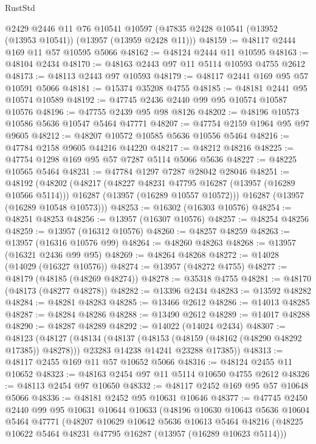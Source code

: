 \begin{lexlean}{RustStd}
\begin{coremodule}
    @2429
    @2446
    @11
    @76
    @10541
    @10597
    (@47835 @2428 @10541 (@13952 (@13953 @10541)) (@13957 (@13959 @2428 @11)))
@48159 := @48117 @2444 @169 @11 @57 @10595 @5066
@48162 := @48124 @2444 @11 @10595
@48163 := @48104 @2434
@48170 := @48163 @2443 @97 @11 @5114 @10593 @4755 @2612
@48173 := @48113 @2443 @97 @10593
@48179 := @48117 @2441 @169 @95 @57 @10591 @5066
@48181 := @15374 @35208 @4755
@48185 := @48181 @2441 @95 @10574 @10589
@48192 := @47745 @2436 @2440 @99 @95 @10574 @10587 @10576
@48196 := @47755 @2439 @95 @98 @8126
@48202 := @48196 @10573 @10586 @5636 @10547 @5464 @47771
@48207 := @47754 @2159 @1964 @95 @97 @9605
@48212 := @48207 @10572 @10585 @5636 @10556 @5464
@48216 := @47784 @2158 @9605 @44216 @44220
@48217 := @48212 @48216
@48225 := @47754 @1298 @169 @95 @57 @7287 @5114 @5066 @5636
@48227 := @48225 @10565 @5464
@48231 := @47784 @1297 @7287 @28042 @28046
@48251 := @48192
    (@48202
      (@48217
        (@48227 @48231 @47795 @16287 (@13957 (@16289 @10566 @5114)))
        @16287
        (@13957 (@16289 @10557 @10572)))
      @16287
      (@13957 (@16289 @10548 @10573)))
@48253 := @16302 (@16303 @10576)
@48254 := @48251 @48253
@48256 := @13957 (@16307 @10576)
@48257 := @48254 @48256
@48259 := @13957 (@16312 @10576)
@48260 := @48257 @48259
@48263 := @13957 (@16316 @10576 @99)
@48264 := @48260 @48263
@48268 := @13957 (@16321 @2436 @99 @95)
@48269 := @48264 @48268
@48272 := @14028 (@14029 (@16327 @10576))
@48274 := @13957 (@48272 @4755)
@48277 := @48179 (@48185 (@48269 @48274))
@48278 := @35318 @4755
@48281 := @48170 (@48173 (@48277 @48278))
@48282 := @13396 @2434
@48283 := @13592 @48282
@48284 := @48281 @48283
@48285 := @13466 @2612
@48286 := @14013 @48285
@48287 := @48284 @48286
@48288 := @13490 @2612
@48289 := @14017 @48288
@48290 := @48287 @48289
@48292 := @14022 (@14024 @2434)
@48307 := @48123
    (@48127
      (@48134
        (@48137 (@48153 (@48159 (@48162 (@48290 @48292 @17385)) @48278)))
        @23283
        @14238
        @14241
        @23288
        @17385))
@48313 := @48117 @2455 @169 @11 @57 @10652 @5066
@48316 := @48124 @2455 @11 @10652
@48323 := @48163 @2454 @97 @11 @5114 @10650 @4755 @2612
@48326 := @48113 @2454 @97 @10650
@48332 := @48117 @2452 @169 @95 @57 @10648 @5066
@48336 := @48181 @2452 @95 @10631 @10646
@48377 := @47745
    @2450
    @2440
    @99
    @95
    @10631
    @10644
    @10633
    (@48196
      @10630
      @10643
      @5636
      @10604
      @5464
      @47771
      (@48207
        @10629
        @10642
        @5636
        @10613
        @5464
        @48216
        (@48225 @10622 @5464 @48231 @47795 @16287 (@13957 (@16289 @10623 @5114)))

\end{coremodule}
\end{lexlean}
